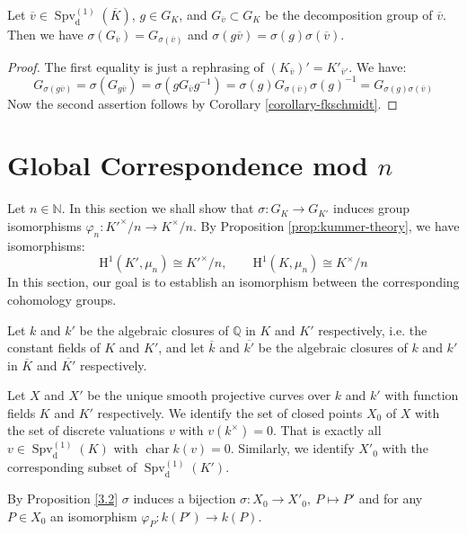 \begin{lemma}\label{lemma-sigma-groupaction-valuation}
Let $\overline{v}\in \operatorname{Spv}_\text{d}^{(1)}(\overline{K})$, $g\in G_K$, and $G_{\overline{v}}\subset G_K$ be the decomposition group of $\overline{v}$. Then we have $\sigma(G_{\overline{v}}) = G_{\sigma(\overline{v})}$ and $\sigma(g\overline{v})=\sigma(g)\sigma(\overline{v})$.
\end{lemma}

\begin{proof}
The first equality is just a rephrasing of $(K_{\overline{v}})' = K'_{\overline{v}'}$. We have:
\[G_{\sigma(g\overline{v})} = \sigma(G_{g\overline{v}}) = \sigma(g G_{\overline{v}}g^{-1}) = \sigma(g) G_{\sigma(\overline{v})}\sigma(g)^{-1} = G_{\sigma(g)\sigma(\overline{v})}\]
Now the second assertion follows by Corollary \ref{corollary-fkschmidt}.
\end{proof}

\section{Global Correspondence mod \texorpdfstring{$n$}{n}}

Let $n\in\mathbb{N}$. In this section we shall show that $\sigma: G_K\to G_{K'}$ induces group isomorphisms $\varphi_n: K'^\times/n\to K^\times/n$. By Proposition \ref{prop:kummer-theory}, we have isomorphisms:
\[ \mathrm{H}^1(K',\mu_n)\cong K'^\times/n,\qquad \mathrm{H}^1(K,\mu_n)\cong K^\times/n \]
In this section, our goal is to establish an isomorphism between the corresponding cohomology groups.

\begin{definition}
Let $k$ and $k'$ be the algebraic closures of $\mathbb{Q}$ in $K$ and $K'$ respectively, i.e. the constant fields of $K$ and $K'$, and let $\overline{k}$ and $\overline{k'}$ be the algebraic closures of $k$ and $k'$ in $\overline{K}$ and $\overline{K'}$ respectively.

Let $X$ and $X'$ be the unique smooth projective curves over $k$ and $k'$ with function fields $K$ and $K'$ respectively. We identify the set of closed points $X_0$ of $X$ with the set of discrete valuations $v$ with $v(k^\times)=0$. That is exactly all $v\in\operatorname{Spv}_\text{d}^{(1)}(K)$ with $\operatorname{char} k(v)=0$. Similarly, we identify $X'_0$ with the corresponding subset of $\operatorname{Spv}_\text{d}^{(1)}(K')$. 

By Proposition \ref{3.2} $\sigma$ induces a bijection $\sigma: X^{\phantom{'}}_0\to X'_0,\ P\mapsto P'$ and for any $P\in X_0$ an isomorphism $\varphi_P: k(P')\to k(P)$.
\end{definition}

